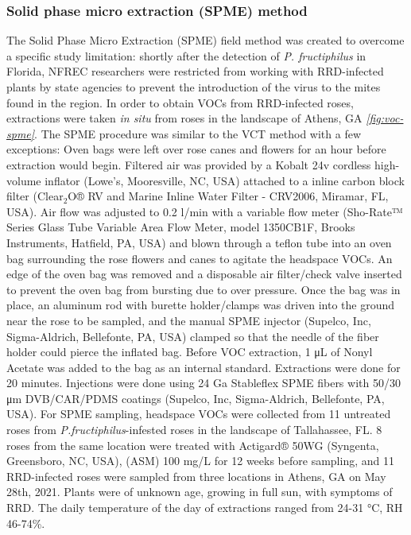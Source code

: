 \documentclass[12pt,final,CPage]{ufthesis}
\begin{document}
{  \hypertarget{mm-spme}{%
  \subsubsection{Solid phase micro extraction (SPME) method}\label{mm-spme}}

  The Solid Phase Micro Extraction (SPME) field method was created to overcome a specific study limitation: shortly after the detection of \emph{P. fructiphilus} in Florida, NFREC researchers were restricted from working with RRD-infected plants by state agencies to prevent the introduction of the virus to the mites found in the region. In order to obtain VOCs from RRD-infected roses, extractions were taken \emph{in situ} from roses in the landscape of Athens, GA \emph{\ref{fig:voc-spme}}. The SPME procedure was similar to the VCT method with a few exceptions: Oven bags were left over rose canes and flowers for an hour before extraction would begin. Filtered air was provided by a Kobalt 24v cordless high-volume inflator (Lowe's, Mooresville, NC, USA) attached to a inline carbon block filter (Clear\(_2\)O® RV and Marine Inline Water Filter - CRV2006, Miramar, FL, USA). Air flow was adjusted to 0.2 \si{\litre}/min with a variable flow meter (Sho-Rate™ Series Glass Tube Variable Area Flow Meter, model 1350CB1F, Brooks Instruments, Hatfield, PA, USA) and blown through a teflon tube into an oven bag surrounding the rose flowers and canes to agitate the headspace VOCs. An edge of the oven bag was removed and a disposable air filter/check valve inserted to prevent the oven bag from bursting due to over pressure. Once the bag was in place, an aluminum rod with burette holder/clamps was driven into the ground near the rose to be sampled, and the manual SPME injector (Supelco, Inc, Sigma-Aldrich, Bellefonte, PA, USA) clamped so that the needle of the fiber holder could pierce the inflated bag. Before VOC extraction, 1 \si{\micro\liter} of Nonyl Acetate was added to the bag as an internal standard. Extractions were done for 20 minutes. Injections were done using 24 Ga Stableflex SPME fibers with 50/30 \si{\micro\meter} DVB/CAR/PDMS coatings (Supelco, Inc, Sigma-Aldrich, Bellefonte, PA, USA). For SPME sampling, headspace VOCs were collected from 11 untreated roses from \emph{P.fructiphilus}-infested roses in the landscape of Tallahassee, FL. 8 roses from the same location were treated with Actigard® 50WG (Syngenta, Greensboro, NC, USA), (ASM) 100 \si{\milli\gram}/\si{\liter} for 12 weeks before sampling, and 11 RRD-infected roses were sampled from three locations in Athens, GA on May 28th, 2021. Plants were of unknown age, growing in full sun, with symptoms of RRD. The daily temperature of the day of extractions ranged from 24-31 °C, RH 46-74\%.

}
\end{document}
